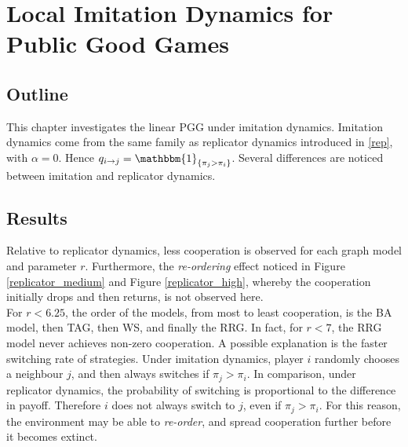 \section{Local Imitation Dynamics for Public Good Games}
\subsection{Outline}
This chapter investigates the linear PGG under imitation dynamics. Imitation dynamics come from the same family as replicator dynamics introduced in \eqref{rep}, with $\alpha = 0$. Hence $q_{i\to j} = \mathbbm{1}_{\{\pi_j>\pi_i\}}$. Several differences are noticed between imitation and replicator dynamics. \\

\subsection{Results}
\FloatBarrier
{} 
\FloatBarrier
{}
\FloatBarrier
{}\FloatBarrier

Relative to replicator dynamics, less cooperation is observed for each graph model and parameter $r$. Furthermore, the \emph{re-ordering} effect noticed in Figure \ref{replicator_medium} and Figure \ref{replicator_high}, whereby the cooperation initially drops and then returns, is not observed here. \\

For $r<6.25$, the order of the models, from most to least cooperation, is the BA model, then TAG, then WS, and finally the RRG. In fact, for $r<7$, the RRG model never achieves non-zero cooperation. A possible explanation is the faster switching rate of strategies. Under imitation dynamics, player $i$ randomly chooses a neighbour $j$, and then always switches if $\pi_j>\pi_i$. In comparison, under replicator dynamics, the probability of switching is proportional to the difference in payoff. Therefore $i$ does not always switch to $j$, even if $\pi_j>\pi_i$. For this reason, the environment may be able to \emph{re-order}, and spread cooperation further before it becomes extinct. \\

